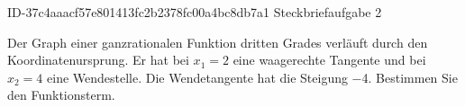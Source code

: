 \begin{exercise}
      {ID-37c4aaacf57e801413fc2b2378fc00a4bc8db7a1}
      {Steckbriefaufgabe 2}
  \ifproblem\problem\par
    Der Graph einer ganzrationalen Funktion dritten Grades verläuft durch
    den Koordinatenursprung. Er hat bei $x_1=\num{2}$ eine waagerechte
    Tangente und bei $x_2=\num{4}$ eine Wendestelle. Die Wendetangente hat
    die Steigung \num{-4}. Bestimmen Sie den Funktionsterm.
  \fi
\end{exercise}
